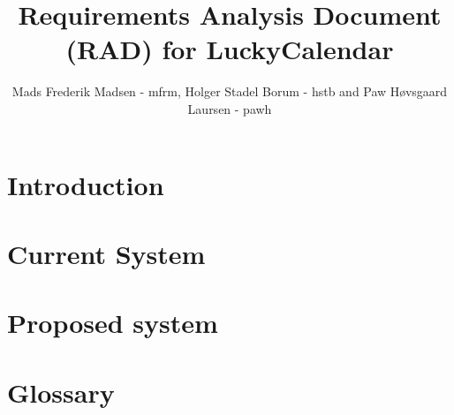 \documentclass{article}
\begin{document}
\title{Requirements Analysis Document (RAD) for LuckyCalendar}
\author{Mads Frederik Madsen - mfrm, Holger Stadel Borum - hstb and Paw H\o vsgaard Laursen - pawh}
\maketitle
\tableofcontents

\section{Introduction}
	

\section{Current System}
	

\section{Proposed system}
	

\section{Glossary}
	
\end{document}
